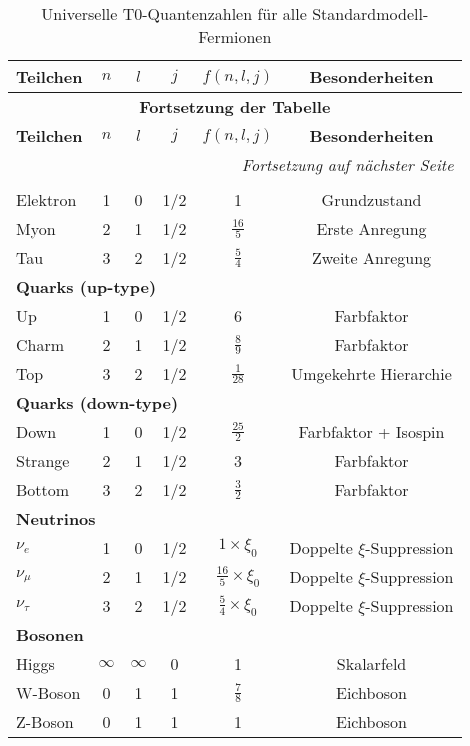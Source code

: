 \documentclass[12pt,a4paper]{article}
\begin{document}
	\begin{longtable}{lccccc}
		\caption{Universelle T0-Quantenzahlen für alle Standardmodell-Fermionen} \\
		\toprule
		\textbf{Teilchen} & \textbf{$n$} & \textbf{$l$} & \textbf{$j$} & \textbf{$f(n,l,j)$} & \textbf{Besonderheiten} \\
		\midrule
		\endfirsthead
		
		\multicolumn{6}{c}{{\bfseries Fortsetzung der Tabelle}} \\
		\toprule
		\textbf{Teilchen} & \textbf{$n$} & \textbf{$l$} & \textbf{$j$} & \textbf{$f(n,l,j)$} & \textbf{Besonderheiten} \\
		\midrule
		\endhead
		
		\midrule
		\multicolumn{6}{r}{\textit{Fortsetzung auf nächster Seite}} \\
		\endfoot
		
		\bottomrule
		\endlastfoot
		
		\multicolumn{6}{l}{\textbf{Geladene Leptonen}} \\
		\midrule
		Elektron & 1 & 0 & 1/2 & 1 & Grundzustand \\
		Myon & 2 & 1 & 1/2 & $\frac{16}{5}$ & Erste Anregung \\
		Tau & 3 & 2 & 1/2 & $\frac{5}{4}$ & Zweite Anregung \\
		\midrule
		\multicolumn{6}{l}{\textbf{Quarks (up-type)}} \\
		\midrule
		Up & 1 & 0 & 1/2 & 6 & Farbfaktor \\
		Charm & 2 & 1 & 1/2 & $\frac{8}{9}$ & Farbfaktor \\
		Top & 3 & 2 & 1/2 & $\frac{1}{28}$ & Umgekehrte Hierarchie \\
		\midrule
		\multicolumn{6}{l}{\textbf{Quarks (down-type)}} \\
		\midrule
		Down & 1 & 0 & 1/2 & $\frac{25}{2}$ & Farbfaktor + Isospin \\
		Strange & 2 & 1 & 1/2 & 3 & Farbfaktor \\
		Bottom & 3 & 2 & 1/2 & $\frac{3}{2}$ & Farbfaktor \\
		\midrule
		\multicolumn{6}{l}{\textbf{Neutrinos}} \\
		\midrule
		$\nu_e$ & 1 & 0 & 1/2 & $1 \times \xi_0$ & Doppelte $\xi$-Suppression \\
		$\nu_\mu$ & 2 & 1 & 1/2 & $\frac{16}{5} \times \xi_0$ & Doppelte $\xi$-Suppression \\
		$\nu_\tau$ & 3 & 2 & 1/2 & $\frac{5}{4} \times \xi_0$ & Doppelte $\xi$-Suppression \\
		\midrule
		\multicolumn{6}{l}{\textbf{Bosonen}} \\
		\midrule
		Higgs & $\infty$ & $\infty$ & 0 & 1 & Skalarfeld \\
		W-Boson & 0 & 1 & 1 & $\frac{7}{8}$ & Eichboson \\
		Z-Boson & 0 & 1 & 1 & 1 & Eichboson \\
		\bottomrule
	\end{longtable}
	
\end{document}
